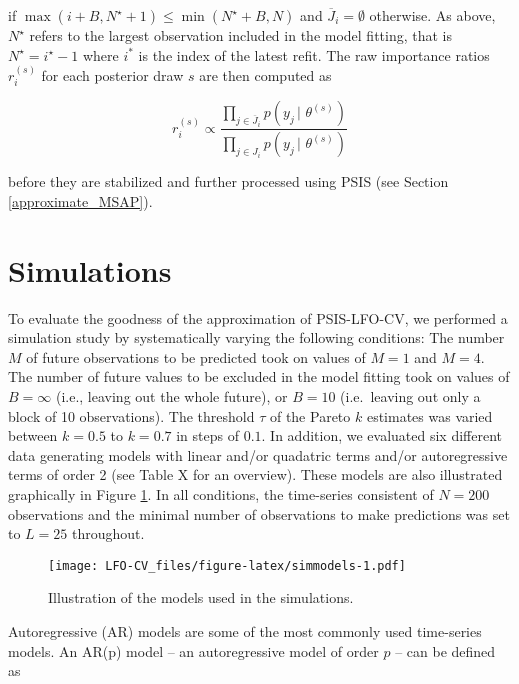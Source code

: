 \documentclass[american,]{article}
\begin{document}
if \(\max(i + B, N^\star + 1) \leq \min(N^\star + B, N)\) and
\(\overline{J}_i = \emptyset\) otherwise. As above, \(N^\star\) refers to the
largest observation included in the model fitting, that is
\(N^\star = i^\star - 1\) where \(i^*\) is the index of the latest refit. The raw
importance ratios \(r_i^{(s)}\) for each posterior draw \(s\) are then computed as

\begin{equation}
r_i^{(s)} \propto \frac{\prod_{j \in \overline{J}_i} p(y_j \,|\, \,\theta^{(s)})}
{\prod_{j \in J_i} p(y_j \,|\, \,\theta^{(s)})}
\end{equation}

before they are stabilized and further processed using PSIS (see Section
\ref{approximate_MSAP}).

\hypertarget{simulations}{%
\section{Simulations}\label{simulations}}

To evaluate the goodness of the approximation of PSIS-LFO-CV,
we performed a simulation study by systematically varying the following
conditions: The number \(M\) of future observations to be predicted took on
values of \(M = 1\) and \(M = 4\). The number of future values to be excluded in the model
fitting took on values of \(B = \infty\) (i.e., leaving out the whole future), or
\(B = 10\) (i.e.~leaving out only a block of 10 observations).
The threshold \(\tau\) of the Pareto \(k\) estimates was varied between
\(k = 0.5\) to \(k = 0.7\) in steps of \(0.1\). In addition, we evaluated six
different data generating models with linear and/or quadatric terms and/or
autoregressive terms of order 2 (see Table X for an overview). These models are
also illustrated graphically in Figure \ref{fig:simmodels}. In all conditions,
the time-series consistent of \(N = 200\) observations and the minimal number
of observations to make predictions was set to \(L = 25\) throughout.

\begin{figure}
\centering
\texttt{[image: LFO-CV\_files/figure-latex/simmodels-1.pdf]}
\caption{\label{fig:simmodels}Illustration of the models used in the simulations.}
\end{figure}

Autoregressive (AR) models are some of the most commonly used time-series models.
An AR(p) model -- an autoregressive model of order \(p\) -- can be defined as
\end{document}
